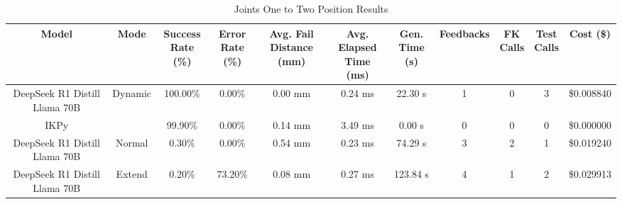 \begin{table}[H]
\tiny
\renewcommand{\arraystretch}{1.2}
\caption{Joints One to Two Position Results}
\begin{center}
\begin{tabular}{|c|c|c|c|c|c|c|c|c|c|c|}
    \hline
    \textbf{Model} & 
    \textbf{Mode} & 
    \makecell{\textbf{Success}\\\textbf{Rate (\%)}} &
    \makecell{\textbf{Error}\\\textbf{Rate (\%)}} &
    \makecell{\textbf{Avg. Fail}\\\textbf{Distance (mm)}} &
    \makecell{\textbf{Avg. Elapsed}\\\textbf{Time (ms)}} &
    \makecell{\textbf{Gen.}\\\textbf{Time (s)}} &
    \textbf{Feedbacks} &
    \makecell{\textbf{FK}\\\textbf{Calls}} &
    \makecell{\textbf{Test}\\\textbf{Calls}} &
    \textbf{Cost (\$)} \\
    \hline
    DeepSeek R1 Distill Llama 70B & Dynamic & 100.00\% & 0.00\% & 0.00 mm & 0.24 ms & 22.30 s & 1 & 0 & 3 & \$0.008840 \\
    \hline
    IKPy &  & 99.90\% & 0.00\% & 0.14 mm & 3.49 ms & 0.00 s & 0 & 0 & 0 & \$0.000000 \\
    \hline
    DeepSeek R1 Distill Llama 70B & Normal & 0.30\% & 0.00\% & 0.54 mm & 0.23 ms & 74.29 s & 3 & 2 & 1 & \$0.019240 \\
    \hline
    DeepSeek R1 Distill Llama 70B & Extend & 0.20\% & 73.20\% & 0.08 mm & 0.27 ms & 123.84 s & 4 & 1 & 2 & \$0.029913 \\
    \hline
\end{tabular}
\label{Results-Position-1-2}
\end{center}
\end{table}

